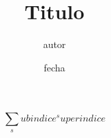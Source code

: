 \documentclass[a4paper]{article}
\title{Titulo}
\author{autor}
\date{fecha}
\begin{document}
 

	$$
	\sum_subindice^superindice %
	$$
\end{document}
